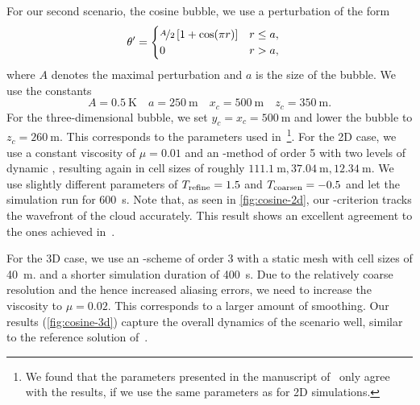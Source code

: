 \documentclass[runningheads]{llncs}
\begin{document}
For our second scenario, the cosine bubble, we use a perturbation of the form
\begin{align}
  \label{eq:cos-pertubation}
  \theta' &= \begin{cases}
    \nicefrac{A}{2} \left[ 1 + \cos(\pi r) \right] & r \leq a, \\
    0 & r > a,
    \end{cases}
\end{align}
where $A$ denotes the maximal perturbation and $a$ is the size of the bubble.
We use the constants
\begin{equation}\label{eq:cosine-bubble}
  A = \SI{0.5}{\K} \quad a = \SI{250}{\m} \quad x_c = \SI{500}{\m} \quad z_c = \SI{350}{\m}.
\end{equation}
For the three-dimensional bubble, we set $y_c = x_c = \SI{500}{\m}$ and lower the bubble to $z_c = \SI{260}{\m}$.
This corresponds to the parameters used in~\cite{kelly2012continuous}\footnote{%
We found that the parameters presented in the manuscript of~\cite{kelly2012continuous} only agree with the results, if we use the same parameters as for 2D simulations.}.
For the 2D case, we use a constant viscosity of $\mu = 0.01$ and an \aderdg{}-method of order 5 with two levels of dynamic \amr{}, resulting again in cell sizes of roughly $\SI{111.1}{\m}, \SI{37.04}{\m}, \SI{12.34}{\m}$.
We use slightly different \amr{} parameters of $T_\text{refine} = 1.5$ and $T_\text{coarsen} = -0.5$ and let the simulation run for \SI{600}{\s}.
Note that, as seen in \cref{fig:cosine-2d}, our \amr{}-criterion tracks the wavefront of the cloud accurately.
This result shows an excellent agreement to the ones achieved in~\cite{giraldo2008study,muller2010adaptive}.

For the 3D case, we use an \aderdg{}-scheme of order 3 with a static mesh with cell sizes of \SI{40}{\m}. and a shorter simulation duration of \SI{400}{\s}.
Due to the relatively coarse resolution and the hence increased aliasing errors, we need to increase the viscosity to $\mu = 0.02$.
This corresponds to a larger amount of smoothing.
Our results (\cref{fig:cosine-3d}) capture the overall dynamics of the scenario well, similar to the reference solution of~\cite{kelly2012continuous}.
\end{document}
